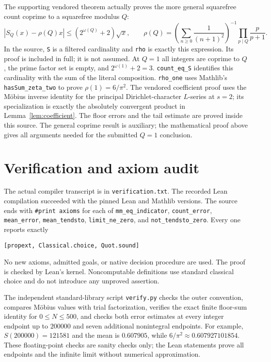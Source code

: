 \documentclass[11pt]{article}
\begin{document}
The supporting vendored theorem actually proves the more general
squarefree count coprime to a squarefree modulus $Q$:
\[
|S_Q(x)-\rho(Q)x|\leq(2^{\omega(Q)}+2)\sqrt{x},\qquad
\rho(Q)=\left(\sum_{n\geq0}\frac1{(n+1)^2}\right)^{-1}
\prod_{p\mid Q}\frac p{p+1}.
\]
In the source, \texttt{S} is a filtered cardinality and
\texttt{rho} is exactly this expression. Its proof is included in full;
it is not assumed. At $Q=1$ all integers are coprime to $Q$, the prime
factor set is empty, and $2^{\omega(1)}+2=3$.
\texttt{count\_eq\_S} identifies this cardinality with the sum of the
literal composition. \texttt{rho\_one} uses Mathlib's
\texttt{hasSum\_zeta\_two} to prove $\rho(1)=6/\pi^2$.
The vendored coefficient proof uses the M\"obius inverse identity for
the principal Dirichlet-character $L$-series at $s=2$; its specialization
is exactly the absolutely convergent product in
Lemma~\ref{lem:coefficient}. The floor errors and the tail estimate are
proved inside this source. The general coprime result is auxiliary;
the mathematical proof above gives all arguments needed for the submitted
$Q=1$ conclusion.

\section{Verification and axiom audit}
The actual compiler transcript is in \texttt{verification.txt}.
The recorded Lean compilation succeeded with the pinned Lean and Mathlib versions.
The source ends with \texttt{\#print axioms} for each of
\texttt{mm\_eq\_indicator}, \texttt{count\_error},
\texttt{mean\_error}, \texttt{mean\_tendsto},
\texttt{limit\_ne\_zero}, and \texttt{not\_tendsto\_zero}.
Every one reports exactly
\begin{lstlisting}
[propext, Classical.choice, Quot.sound]
\end{lstlisting}
No new axioms, admitted goals, or native decision procedure are used.
The proof is checked by Lean's kernel. Noncomputable definitions use
standard classical choice and do not introduce any unproved assertion.

The independent standard-library script \texttt{verify.py} checks the
outer convention, compares M\"obius values with trial factorization,
verifies the exact finite floor-sum identity for $0\leq N\leq500$, and
checks both error estimates at every integer endpoint up to $200000$
and seven additional nonintegral endpoints. For example,
$S(200000)=121581$ and the mean is $0.607905$, while
$6/\pi^2\approx0.607927101854$. These floating-point checks are sanity
checks only; the Lean statements prove all endpoints and the infinite
limit without numerical approximation.
\end{document}
